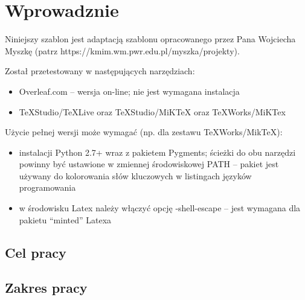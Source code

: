 
\chapter*{Wprowadznie}

Niniejszy szablon jest adaptacją szablonu opracowanego przez Pana Wojciecha Myszkę (patrz https://kmim.wm.pwr.edu.pl/myszka/projekty).

Został przetestowany w następujących narzędziach:
\begin{itemize}
\item Overleaf.com -- wersja on-line; nie jest wymagana instalacja
\item TeXStudio/TeXLive oraz TeXStudio/MiKTeX oraz TeXWorks/MiKTex
\end{itemize}

Użycie pełnej wersji może wymagać (np. dla zestawu TeXWorks/MikTeX):
\begin{itemize}
\item instalacji Python 2.7+ wraz z pakietem Pygments; ścieżki do obu narzędzi powinny być ustawione w zmiennej środowiskowej PATH -- pakiet jest używany do kolorowania słów kluczowych w listingach języków programowania
\item w środowisku Latex należy włączyć opcję -shell-escape  -- jest wymagana dla pakietu ``minted'' Latexa 
\end{itemize}

\section*{Cel pracy}

\lipsum[5]

\section*{Zakres pracy}

\lipsum[6]